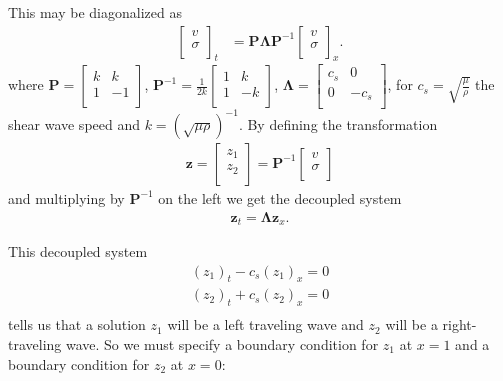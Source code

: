 \documentclass[12pt]{article}
\begin{document}
\begin{flushleft}
This may be diagonalized as
\begin{align*}
\begin{bmatrix}
v \\
\sigma \\
\end{bmatrix}_t &= \mathbf{P} \boldsymbol{\Lambda} \mathbf{P}^{-1} \begin{bmatrix}
v \\
\sigma \\
\end{bmatrix}_x.
\end{align*}
where $\mathbf{P} = \begin{bmatrix}
k & k \\
1 & -1\\
\end{bmatrix}$, $\mathbf{P}^{-1} =\frac{1}{2k} \begin{bmatrix}
1 & k \\
1 & -k\\
\end{bmatrix}$, $\boldsymbol{\Lambda} = \begin{bmatrix}
c_s & 0 \\
0 & -c_s \\
\end{bmatrix}$, for $c_s = \sqrt{\frac{\mu}{\rho}}$ the shear wave speed and $k = (\sqrt{\mu \rho } )^{-1}$. By defining the transformation
\begin{align*}
\mathbf{z} = \begin{bmatrix}
z_1 \\
z_2\\
\end{bmatrix} = \mathbf{P}^{-1} \begin{bmatrix}
v \\
\sigma \\
\end{bmatrix}
\end{align*}
and multiplying by $\mathbf{P}^{-1}$ on the left we get the decoupled system
\begin{align*}
\mathbf{z}_t = \boldsymbol{\Lambda} \mathbf{z}_x.
\end{align*}

This decoupled system
\begin{align*}
(z_1)_t - c_s (z_1)_x = 0 \\
(z_2)_t + c_s (z_2)_x = 0\\
\end{align*}
tells us that a solution $z_1$ will be a left traveling wave and $z_2$ will be a right-traveling wave. So we must specify a boundary condition for $z_1$ at $x=1$ and a boundary condition for $z_2$ at $x=0$:


\end{flushleft}
\end{document}
